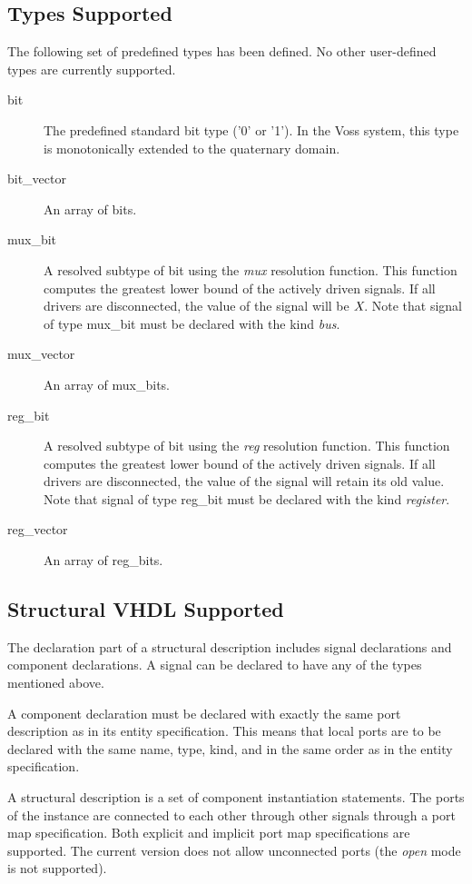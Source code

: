 \subsection{Types Supported}

The following set of predefined types has been defined.
No other user-defined types are currently supported.
\begin{description}
\item[bit]
The predefined standard bit type ('0' or '1').
In the Voss system, this type is monotonically extended to the
quaternary domain.
\item[bit\_vector]
An array of bits.
\item[mux\_bit]
A resolved subtype of bit using the {\em mux} resolution function.
This function computes the greatest lower bound of the actively
driven signals.
If all drivers are disconnected, the value of the signal will be $\mbox{\em X}$.
Note that signal of type mux\_bit must be declared with the kind {\em bus}.
\item[mux\_vector]
An array of mux\_bits.
\item[reg\_bit]
A resolved subtype of bit using the {\em reg} resolution function.
This function computes the greatest lower bound of the actively
driven signals.
If all drivers are disconnected, the value of
the signal will retain its old value.
Note that signal of type reg\_bit must be declared
with the kind {\em register}.
\item[reg\_vector]
An array of reg\_bits.
\end{description}

\subsection{Structural VHDL Supported}

The declaration part of a structural description includes
signal declarations and component declarations.
A signal can be declared to have any of the types mentioned above. 

A component declaration must be declared with exactly the same port description
as in its entity specification.
This means that local ports are to be declared with the same name, type,
kind, and in the same order as in the entity specification.

A structural description is a set of component instantiation statements.
The ports of the instance are connected to each other through other signals
through a port map specification.
Both explicit and implicit port map specifications are supported.
The current version does not allow unconnected ports (the {\em open}
mode is not supported).

